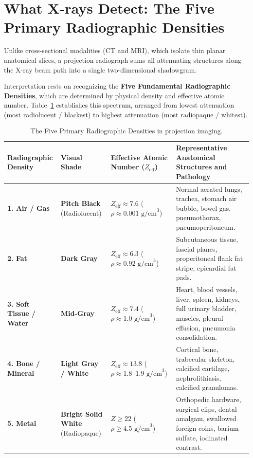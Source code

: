 \documentclass[11pt,a4paper]{article}
\begin{document}
\section{What X-rays Detect: The Five Primary Radiographic Densities}

Unlike cross-sectional modalities (CT and MRI), which isolate thin planar anatomical slices, a projection radiograph sums all attenuating structures along the X-ray beam path into a single two-dimensional shadowgram.

Interpretation rests on recognizing the \textbf{Five Fundamental Radiographic Densities}, which are determined by physical density and effective atomic number. Table~\ref{tab:radiographic_densities} establishes this spectrum, arranged from lowest attenuation (most radiolucent / blackest) to highest attenuation (most radiopaque / whitest).

\begin{table}[htbp]
\centering
\small
\renewcommand{\arraystretch}{1.25}
\begin{tabular}{p{3.2cm}p{3cm}p{3.5cm}p{5.5cm}}
\toprule
\textbf{Radiographic Density} & \textbf{Visual Shade} & \textbf{Effective Atomic Number ($Z_{\text{eff}}$)} & \textbf{Representative Anatomical Structures and Pathology} \\
\midrule
\textbf{1. Air / Gas} & \textbf{Pitch Black} (Radiolucent) & $Z_{\text{eff}} \approx 7.6$ ($\rho \approx 0.001\text{ g/cm}^3$) & Normal aerated lungs, trachea, stomach air bubble, bowel gas, pneumothorax, pneumoperitoneum. \\
\textbf{2. Fat} & \textbf{Dark Gray} & $Z_{\text{eff}} \approx 6.3$ ($\rho \approx 0.92\text{ g/cm}^3$) & Subcutaneous tissue, fascial planes, properitoneal flank fat stripe, epicardial fat pads. \\
\textbf{3. Soft Tissue / Water} & \textbf{Mid-Gray} & $Z_{\text{eff}} \approx 7.4$ ($\rho \approx 1.0\text{ g/cm}^3$) & Heart, blood vessels, liver, spleen, kidneys, full urinary bladder, muscles, pleural effusion, pneumonia consolidation. \\
\textbf{4. Bone / Mineral} & \textbf{Light Gray / White} & $Z_{\text{eff}} \approx 13.8$ ($\rho \approx 1.8\text{--}1.9\text{ g/cm}^3$) & Cortical bone, trabecular skeleton, calcified cartilage, nephrolithiasis, calcified granulomas. \\
\textbf{5. Metal} & \textbf{Bright Solid White} (Radiopaque) & $Z \ge 22$ ($\rho \ge 4.5\text{ g/cm}^3$) & Orthopedic hardware, surgical clips, dental amalgam, swallowed foreign coins, barium sulfate, iodinated contrast. \\
\bottomrule
\end{tabular}
\caption{The Five Primary Radiographic Densities in projection imaging.}
\label{tab:radiographic_densities}
\end{table}
\end{document}

